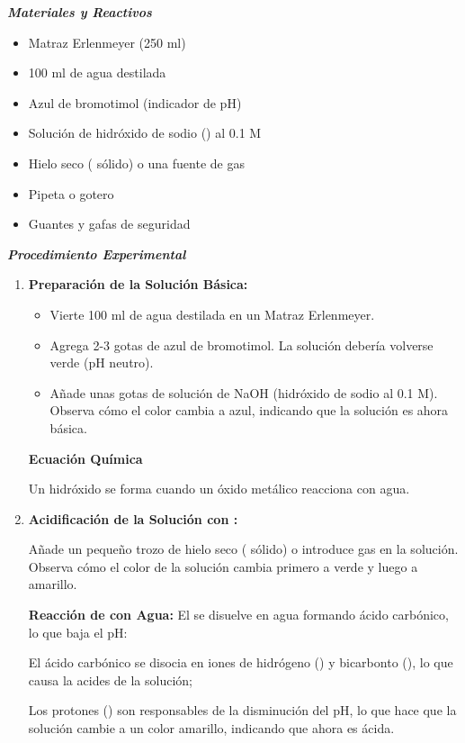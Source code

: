     \textit{\textbf{Materiales y Reactivos  }}
    \begin{itemize}
        \item Matraz Erlenmeyer (250 ml)
        \item 100 ml de agua destilada
        \item Azul de bromotimol (indicador de pH)
        \item Solución de hidróxido de sodio () al 0.1 M
        \item Hielo seco ( sólido) o una fuente de gas 
        \item Pipeta o gotero
        \item Guantes y gafas de seguridad
    \end{itemize}
    \clearpage
    \textit{\textbf{Procedimiento Experimental  }}
    \begin{enumerate}
        \item \textbf{Preparación de la Solución Básica: }
        \begin{itemize}
            \item Vierte 100 ml de agua destilada en un Matraz Erlenmeyer.
            \item Agrega 2-3 gotas de azul de bromotimol. La solución debería volverse verde (pH neutro).
            \item Añade unas gotas de solución de NaOH (hidróxido de sodio al 0.1 M). Observa cómo el color cambia a azul, indicando que la solución es ahora básica.
        \end{itemize}
    
        \textbf{Ecuación Química  }
        \begin{center}
        \end{center}

        Un hidróxido se forma cuando un óxido metálico reacciona con agua.
        
        \item \textbf{Acidificación de la Solución con :}

        Añade un pequeño trozo de hielo seco ( sólido) o introduce gas  en la solución. Observa cómo el color de la solución cambia primero a verde y luego a amarillo.

        \textbf{Reacción de  con Agua:}
        El  se disuelve en agua formando ácido carbónico, lo que baja el pH:
        
        \begin{center}
        \end{center}
        
        El ácido carbónico se disocia en iones de hidrógeno () y bicarbonto (), lo que causa la acides de la solución;
        
        \begin{center}
        \end{center}

        Los protones () son responsables de la disminución del pH, lo que hace que la solución cambie a un color amarillo, indicando que ahora es ácida.
    \end{enumerate}
